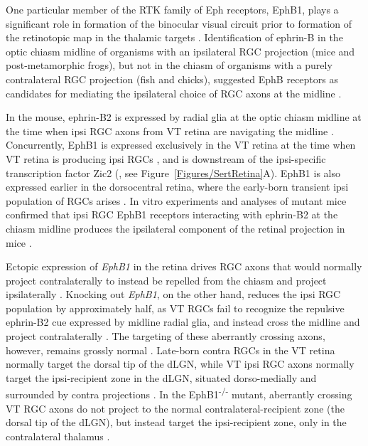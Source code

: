One particular member of the RTK family of Eph receptors, EphB1, plays a significant role in formation of the binocular visual circuit prior to formation of the retinotopic map in the thalamic targets \cite{williams2003ephrin,petros2008retinal,lee2008zic2}.
Identification of ephrin-B in the optic chiasm midline of organisms with an ipsilateral RGC projection (mice and post-metamorphic frogs), but not in the chiasm of organisms with a purely contralateral RGC projection (fish and chicks), suggested EphB receptors as candidates for mediating the ipsilateral choice of RGC axons at the midline \cite{nakagawa2000ephrin}.

In the mouse, ephrin-B2 is expressed by radial glia at the optic chiasm midline at the time when ipsi RGC axons from VT retina are navigating the midline \cite{williams2003ephrin}.
Concurrently, EphB1 is expressed exclusively in the VT retina at the time when VT retina is producing ipsi RGCs \cite{williams2003ephrin}, and is downstream of the ipsi-specific transcription factor Zic2 (, see Figure~\ref{Figures/SertRetina}A).
EphB1 is also expressed earlier in the dorsocentral retina, where the early-born transient ipsi population of RGCs arises \cite{drager1985birth,williams2003ephrin}.
In vitro experiments and analyses of mutant mice confirmed that ipsi RGC EphB1 receptors interacting with ephrin-B2 at the chiasm midline produces the ipsilateral component of the retinal projection in mice \cite{williams2003ephrin,petros2009specificity,petros2010ephrin,chenaux2011forward}.

Ectopic expression of \emph{EphB1} in the retina drives RGC axons that would normally project contralaterally to instead be repelled from the chiasm and project ipsilaterally \cite{petros2009specificity}.
Knocking out \emph{EphB1}, on the other hand, reduces the ipsi RGC population by approximately half, as VT RGCs fail to recognize the repulsive ephrin-B2 cue expressed by midline radial glia, and instead cross the midline and project contralaterally \cite{williams2003ephrin}.
The targeting of these aberrantly crossing axons, however, remains grossly normal \cite{rebsam2009switching}.
Late-born contra RGCs in the VT retina normally target the dorsal tip of the dLGN, while VT ipsi RGC axons normally target the ipsi-recipient zone in the dLGN, situated dorso-medially and surrounded by contra projections \cite{pfeiffenberger2006ephrin,rebsam2009switching}.
In the EphB1\textsuperscript{-/-} mutant, aberrantly crossing VT RGC axons do not project to the normal contralateral-recipient zone (the dorsal tip of the dLGN), but instead target the ipsi-recipient zone, only in the contralateral thalamus \cite{rebsam2009switching}.


